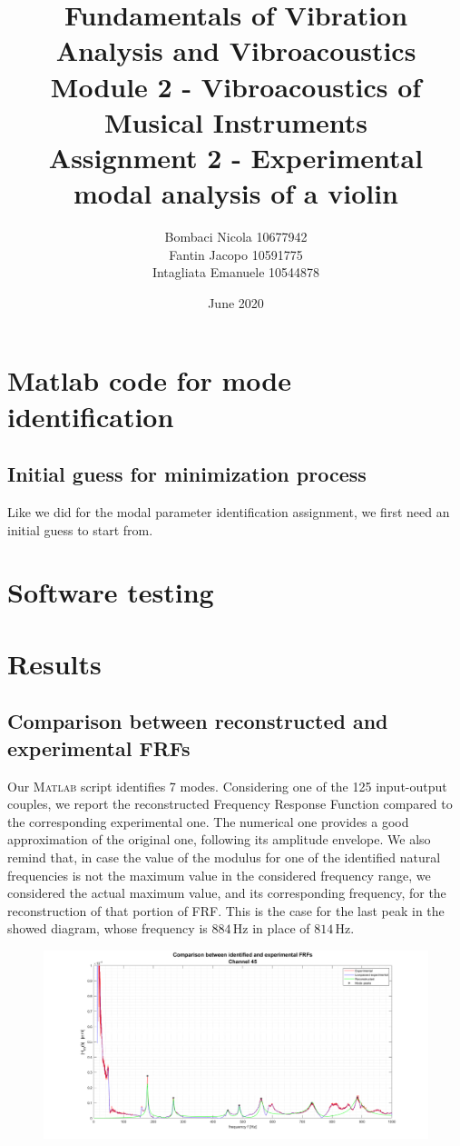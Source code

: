 \documentclass[a4paper,12pt,oneside]{article}
\title{Fundamentals of Vibration Analysis and Vibroacoustics \\
	Module 2 - Vibroacoustics of Musical Instruments \\
	Assignment 2 - Experimental modal analysis of a violin}
\author{Bombaci Nicola 10677942 \\
	Fantin Jacopo 10591775 \\
	Intagliata Emanuele 10544878}
\date{June 2020}
\begin{document}
\maketitle

\vspace{100pt}


\section{Matlab code for mode identification}

\subsection{Initial guess for minimization process}

Like we did for the modal parameter identification assignment, we first need an initial guess to start from.


\section{Software testing}




\section{Results}

\subsection{Comparison between reconstructed and experimental FRFs}

Our \textsc{Matlab} script identifies 7 modes. Considering one of the 125 input-output couples, we report the reconstructed Frequency Response Function compared to the corresponding experimental one. The numerical one provides a good approximation of the original one, following its amplitude envelope. We also remind that, in case the value of the modulus for one of the identified natural frequencies is not the maximum value in the considered frequency range, we considered the actual maximum value, and its corresponding frequency, for the reconstruction of that portion of FRF. This is the case for the last peak in the showed diagram, whose frequency is $ 884 \, \text{Hz} $ in place of $ 814 \, \text{Hz} $.

\begin{figure}[H]
	\hspace{-70pt}
	\includegraphics[scale=0.4]{frf_rec_vs_exp_ch45}
\end{figure}
\end{document}
